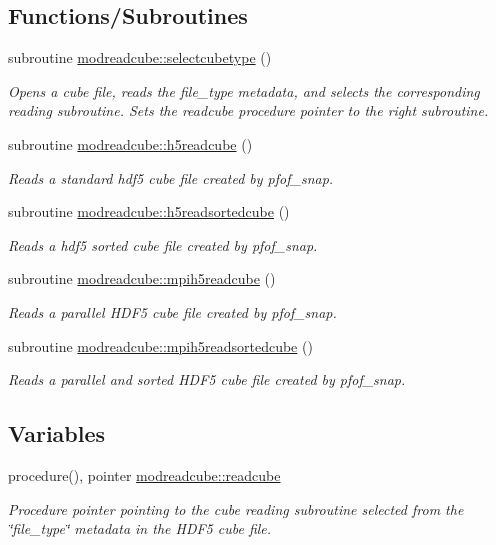 \subsection*{Functions/\+Subroutines}
\begin{DoxyCompactItemize}
\item 
subroutine \hyperlink{namespacemodreadcube_a9c2a086c3d23dcb886817558a3592218}{modreadcube\+::selectcubetype} ()
\begin{DoxyCompactList}\small\item\em Opens a cube file, reads the file\+\_\+type metadata, and selects the corresponding reading subroutine. Sets the readcube procedure pointer to the right subroutine. \end{DoxyCompactList}\item 
subroutine \hyperlink{namespacemodreadcube_a9b00396dd9eab642a275a7aa06d9cd20}{modreadcube\+::h5readcube} ()
\begin{DoxyCompactList}\small\item\em Reads a standard hdf5 cube file created by pfof\+\_\+snap. \end{DoxyCompactList}\item 
subroutine \hyperlink{namespacemodreadcube_a30050fd5631222b0125e7917cc8ae547}{modreadcube\+::h5readsortedcube} ()
\begin{DoxyCompactList}\small\item\em Reads a hdf5 sorted cube file created by pfof\+\_\+snap. \end{DoxyCompactList}\item 
subroutine \hyperlink{namespacemodreadcube_af92f4077b7cf70887bb67a38909f1a27}{modreadcube\+::mpih5readcube} ()
\begin{DoxyCompactList}\small\item\em Reads a parallel H\+D\+F5 cube file created by pfof\+\_\+snap. \end{DoxyCompactList}\item 
subroutine \hyperlink{namespacemodreadcube_afc147b0f2e67c88cc8d7d0dd06ae8ff7}{modreadcube\+::mpih5readsortedcube} ()
\begin{DoxyCompactList}\small\item\em Reads a parallel and sorted H\+D\+F5 cube file created by pfof\+\_\+snap. \end{DoxyCompactList}\end{DoxyCompactItemize}
\subsection*{Variables}
\begin{DoxyCompactItemize}
\item 
procedure(), pointer \hyperlink{namespacemodreadcube_af4018b3e5809ee7ec7974a7601f2b304}{modreadcube\+::readcube}
\begin{DoxyCompactList}\small\item\em Procedure pointer pointing to the cube reading subroutine selected from the \char`\"{}file\+\_\+type\char`\"{} metadata in the H\+D\+F5 cube file. \end{DoxyCompactList}\end{DoxyCompactItemize}



